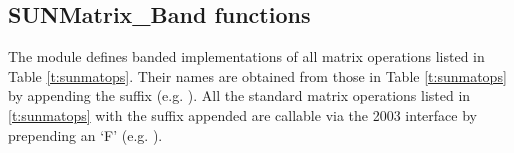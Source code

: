 \subsection{SUNMatrix\_Band functions}
\label{ss:sunmat_band_functions}

The {\sunmatband} module defines banded implementations of all matrix
operations listed in Table \ref{t:sunmatops}. Their names are obtained
from those in Table \ref{t:sunmatops} by appending the
suffix  (e.g. ).
All the standard matrix operations listed in \ref{t:sunmatops} with the suffix
 appended are callable via the {\F} 2003 interface by prepending an
`F' (e.g. ).

